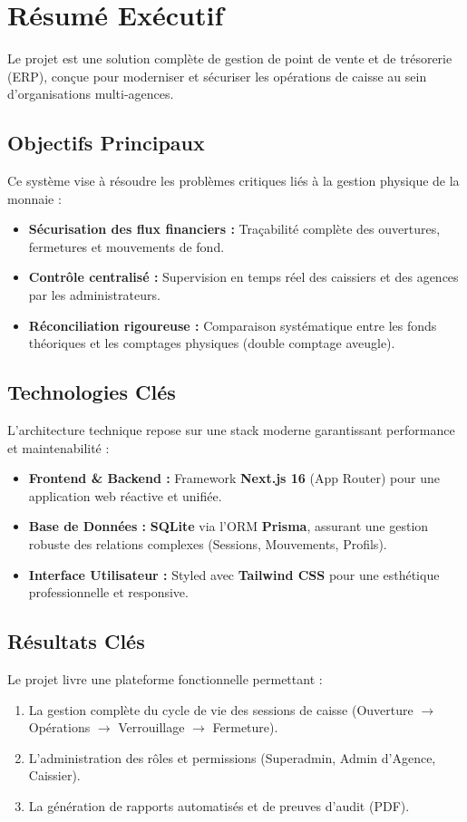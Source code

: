 \chapter*{Résumé Exécutif}

Le projet \textbf{\projectName} est une solution complète de gestion de point de vente et de trésorerie (ERP), conçue pour moderniser et sécuriser les opérations de caisse au sein d'organisations multi-agences.

\section*{Objectifs Principaux}
Ce système vise à résoudre les problèmes critiques liés à la gestion physique de la monnaie :
\begin{itemize}
    \item \textbf{Sécurisation des flux financiers :} Traçabilité complète des ouvertures, fermetures et mouvements de fond.
    \item \textbf{Contrôle centralisé :} Supervision en temps réel des caissiers et des agences par les administrateurs.
    \item \textbf{Réconciliation rigoureuse :} Comparaison systématique entre les fonds théoriques et les comptages physiques (double comptage aveugle).
\end{itemize}

\section*{Technologies Clés}
L'architecture technique repose sur une stack moderne garantissant performance et maintenabilité :
\begin{itemize}
    \item \textbf{Frontend & Backend :} Framework \textbf{Next.js 16} (App Router) pour une application web réactive et unifiée.
    \item \textbf{Base de Données :} \textbf{SQLite} via l'ORM \textbf{Prisma}, assurant une gestion robuste des relations complexes (Sessions, Mouvements, Profils).
    \item \textbf{Interface Utilisateur :} Styled avec \textbf{Tailwind CSS} pour une esthétique professionnelle et responsive.
\end{itemize}

\section*{Résultats Clés}
Le projet livre une plateforme fonctionnelle permettant :
\begin{enumerate}
    \item La gestion complète du cycle de vie des sessions de caisse (Ouverture $\to$ Opérations $\to$ Verrouillage $\to$ Fermeture).
    \item L'administration des rôles et permissions (Superadmin, Admin d'Agence, Caissier).
    \item La génération de rapports automatisés et de preuves d'audit (PDF).
\end{enumerate}
